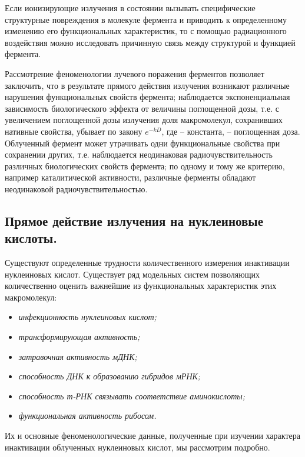 \documentclass[a4paper, 14pt]{article}
\renewcommand{\emph}[1]{{\color{orange}{\textit{\textbf{#1}}}}}
\begin{document}
Если ионизирующие излучения в состоянии вызывать специфические
структурные повреждения в молекуле фермента и приводить к определенному
изменению его функциональных характеристик, то с помощью радиационного
воздействия можно исследовать причинную связь между структурой и функцией
фермента.

Рассмотрение феноменологии лучевого поражения ферментов позволяет
заключить, что в результате прямого действия излучения возникают различные
нарушения функциональных свойств фермента; наблюдается экспоненциальная
зависимость биологического эффекта от величины поглощенной дозы, т.е. с
увеличением поглощенной дозы излучения доля макромолекул, сохранивших
нативные свойства, убывает по закону $e^{-kD}$, где \emph{k} – константа, \emph{D} – поглощенная доза. Облученный фермент может утрачивать одни функциональные свойства при
сохранении других, т.е. наблюдается неодинаковая радиочувствительность различных
биологических свойств фермента; по одному и тому же критерию, например
каталитической активности, различные ферменты обладают неодинаковой
радиочувствительностью.

\subsection{Прямое действие излучения на нуклеиновые кислоты.}
Существуют определенные трудности количественного измерения инактивации
нуклеиновых кислот. Существует ряд модельных систем позволяющих количественно
оценить важнейшие из функциональных характеристик этих макромолекул:
\begin{itemize}
    \item \textit{инфекционность нуклеиновых кислот;}
    \item \textit{трансформирующая активность;}
    \item \textit{затравочная активность мДНК;}
    \item \textit{способность ДНК к образованию гибридов мРНК;}
    \item \textit{способность т-РНК связывать соответствие аминокислоты;}
    \item \textit{функциональная активность рибосом.}
\end{itemize}
Их и основные феноменологические данные, полученные при изучении
характера инактивации облученных нуклеиновых кислот, мы рассмотрим подробно.
\end{document}
